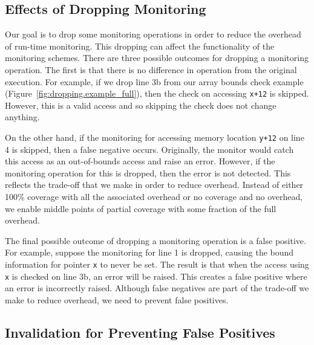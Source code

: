 \subsection{Effects of Dropping Monitoring}
\label{sec:dropping.false_neg_pos}

Our goal is to drop some monitoring operations in order to reduce the overhead
of run-time monitoring. This dropping can affect the functionality of the
monitoring schemes. There are three possible outcomes for dropping a
monitoring operation. The first is that there is no difference in operation
from the original execution. For example, if we drop line 3b from our array
bounds check example (Figure~\ref{fig:dropping.example_full}), then the
check on accessing {\tt x+12} is skipped. However, this is a valid access and so
skipping the check does not change anything.

On the other hand, if the monitoring for accessing memory location {\tt y+12} on
line 4 is skipped, then
a false negative occurs. Originally, the monitor would catch this access as an
out-of-bounds access and raise an error. However, if the monitoring operation
for this is dropped, then the error is not detected. This reflects the trade-off that
we make in order to reduce overhead. Instead of either 100\% coverage
with all the associated overhead or no coverage and no overhead, we 
enable middle points of partial coverage with some fraction of the full
overhead.

The final possible outcome of dropping a monitoring operation is a false positive. 
For example, suppose the monitoring for
line 1 is dropped, causing the bound information for pointer {\tt x} to never
be set. The result is that when the access using {\tt x} is checked on line 3b,
an error will be raised. This creates a false positive where an error is
incorrectly raised. Although false negatives are part of the trade-off we make
to reduce overhead, we need to prevent false positives.

\subsection{Invalidation for Preventing False Positives}
\label{sec:dropping.prevent_false_pos}


